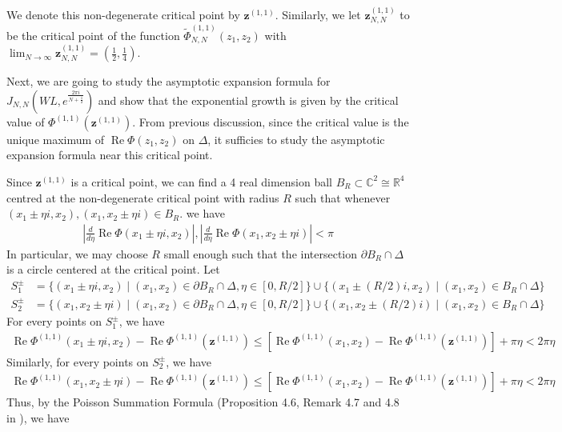 \documentclass[10pt,a4paper]{article}
\newcommand{\lt}{\left}
\newcommand{\rt}{\right}
\def \CC{\mathbb C}
\def \Re{\operatorname{Re}}
\def\CC{{\mathbb C}}
\def\RR{{\mathbb R}}
\def \Re{\operatorname{Re}}
\begin{document}
We denote this non-degenerate critical point by $\mathbf{z}^{(1,1)}$. Similarly, we let $\mathbf{z}^{(1,1)}_{N,N}$ to be the critical point of the function $\tilde\Phi^{(1,1)}_{N,N}(z_1,z_2)$ with $\lim_{N\to \infty}\mathbf{z}^{(1,1)}_{N,N}= (\frac{1}{2},\frac{1}{4})$. 

Next, we are going to study the asymptotic expansion formula for $J_{N,N}(WL, e^{\frac{2\pi i}{N+\frac{1}{2}}})$ and show that the exponential growth is given by the critical value of $\Phi^{(1,1)} \lt(\mathbf{z}^{(1,1)}\rt)$. From previous discussion, since the critical value is the unique maximum of $\Re\Phi(z_1,z_2)$ on $\Delta$, it sufficies to study the asymptotic expansion formula near this critical point. 

Since $\mathbf{z}^{(1,1)}$ is a critical point, we can find a 4 real dimension ball $B_R \subset \CC^2 \cong \RR^4$ centred at the non-degenerate critical point with radius $R$ such that whenever $(x_1\pm\eta i,x_2), (x_1, x_2\pm\eta i) \in B_R $. we have  
\begin{align}\label{ball}
 \lt| \frac{d}{d \eta} \Re\Phi(x_1\pm\eta i,x_2) \rt|, \lt| \frac{d}{d\eta} \Re\Phi(x_1, x_2\pm\eta i)  \rt| < \pi 
\end{align}
In particular, we may choose $R$ small enough such that the intersection $\partial B_R \cap \Delta$ is a circle centered at the critical point. Let
\begin{align*}
S^\pm_1 &= \{ (x_1\pm\eta i, x_2) \mid (x_1,x_2) \in \partial B_R \cap \Delta, \eta \in [0,R /2]  \}
\cup \{ (x_1\pm ( R/2 ) i, x_2) \mid (x_1,x_2) \in B_R \cap \Delta \} \\
S^\pm_2 &= \{ (x_1, x_2\pm\eta i) \mid (x_1,x_2) \in \partial B_R \cap \Delta, \eta \in [0,R /2]  \} 
\cup \{ (x_1, x_2\pm ( R/2 ) i) \mid (x_1,x_2) \in B_R \cap \Delta \}
\end{align*}
For every points on $S_1^\pm$, we have
\begin{align}\label{S1}
\Re\Phi^{(1,1)}(x_1 \pm \eta i, x_2) - \Re\Phi^{(1,1)}(\mathbf{z}^{(1,1)}) \leq \lt[\Re\Phi^{(1,1)}(x_1,x_2) - \Re\Phi^{(1,1)}(\mathbf{z}^{(1,1)}) \rt] + \pi \eta < 2\pi \eta
\end{align}
Similarly, for every points on $S_2^\pm$, we have
\begin{align}\label{S2}
\Re\Phi^{(1,1)}(x_1, x_2 \pm \eta i) - \Re\Phi^{(1,1)}(\mathbf{z}^{(1,1)}) \leq \lt[\Re\Phi^{(1,1)}(x_1,x_2) - \Re\Phi^{(1,1)}(\mathbf{z}^{(1,1)}) \rt] + \pi \eta < 2\pi \eta
\end{align}
Thus, by the Poisson Summation Formula (Proposition 4.6, Remark 4.7 and 4.8 in \cite{O52}), we have
\end{document}

